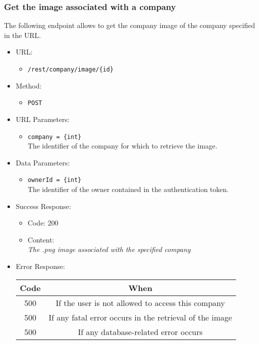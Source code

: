 \newpage
\subsubsection*{Get the image associated with a company}

The following endpoint allows to get the company image of the company specified in the URL.

\begin{itemize}

    \item URL:
    \begin{itemize}
        \item \texttt{/rest/company/image/\{id\}}
    \end{itemize}

    \item Method:
    \begin{itemize}
        \item \texttt{POST}
    \end{itemize}

    \item URL Parameters:
    \begin{itemize}
        \item \texttt{company = \{int\}} \\
        The identifier of the company for which to retrieve the image.
    \end{itemize}
    \item Data Parameters:
    \begin{itemize}
        \item \texttt{ownerId = \{int\}} \\
        The identifier of the owner contained in the authentication token.
    \end{itemize}

    \item Success Response:
    \begin{itemize}
        \item Code: 200
        \item Content: \\
        \qquad \textit{The .png image associated with the specified company}
    \end{itemize}

    \item Error Response:
    \begin{table}[!h]
    \centering
    \begin{tabular}{|c|c|}
    \hline
    \multicolumn{1}{|c|}{\textbf{Code}} & \multicolumn{1}{c|}{\textbf{When}} \\ \hline
    500 & If the user is not allowed to access this company \\\hline
    500 & If any fatal error occurs in the retrieval of the image \\\hline
    500 & If any database-related error occurs \\\hline
    \end{tabular}
    \end{table}

\end{itemize}



